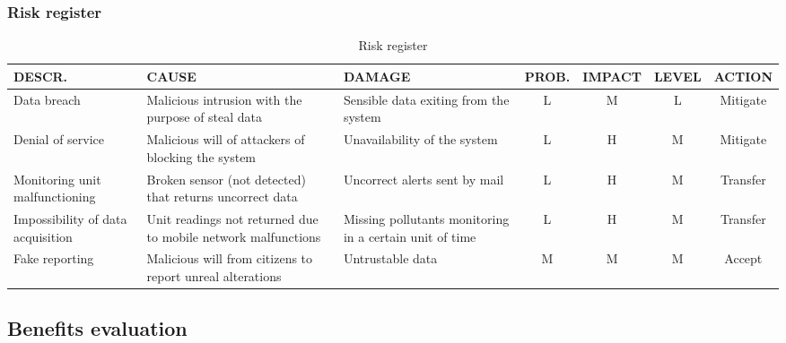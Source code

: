 \subsubsection{Risk register}
\begin{table}[H]
    \centering
    \begin{tabularx}{\columnwidth}{|X|X|X|c|c|c|c|}
    \hline
    \textbf{DESCR.} & \textbf{CAUSE} & \textbf{DAMAGE} & \textbf{PROB.} & \textbf{IMPACT} & \textbf{LEVEL} & \textbf{ACTION} \\ \hline
    Data breach & Malicious intrusion with the purpose of steal data & Sensible data exiting from the system & \cellcolor{green!25}L & \cellcolor{orange!25}M & \cellcolor{green!25}L & Mitigate \\ \hline
    Denial of service & Malicious will of attackers of blocking the system & Unavailability of the system & \cellcolor{green!25}L & \cellcolor{red!25}H & \cellcolor{orange!25}M & Mitigate \\ \hline
    Monitoring unit malfunctioning & Broken sensor (not detected) that returns uncorrect data & Uncorrect alerts sent by mail & \cellcolor{green!25}L & \cellcolor{red!25}H & \cellcolor{orange!25}M & Transfer \\ \hline
    Impossibility of data acquisition & Unit readings not returned due to mobile network malfunctions & Missing pollutants monitoring in a certain unit of time & \cellcolor{green!25}L & \cellcolor{red!25}H & \cellcolor{orange!25}M & Transfer \\ \hline
    Fake reporting & Malicious will from citizens to report unreal alterations & Untrustable data & \cellcolor{orange!25}M & \cellcolor{orange!25}M & \cellcolor{orange!25}M & Accept \\ \hline
    \end{tabularx}
    \caption{Risk register}
    \label{register}
\end{table}

\pagebreak
\subsection{Benefits evaluation}
